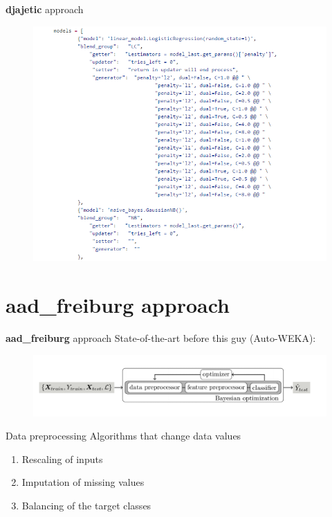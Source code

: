 \documentclass[12pt]{beamer}
\begin{document}
\begin{frame}{\textbf{djajetic} approach}
\small
\begin{figure}
\includegraphics[scale=0.48]{Croat_code.png} 
\end{figure}
\end{frame}

\section{aad\_freiburg approach}

\begin{frame}{\textbf{aad\_freiburg} approach}
State-of-the-art before this guy  (Auto-WEKA):
\begin{figure}
\includegraphics[scale=0.35]{Auto_weka.png} 
\end{figure}
\end{frame}

\begin{frame}{Data preprocessing}
Algorithms that change data values
\begin{enumerate}
    \item Rescaling of inputs
    \item Imputation of missing values
    \item Balancing of the target classes
\end{enumerate}

\end{frame}
\end{document}
